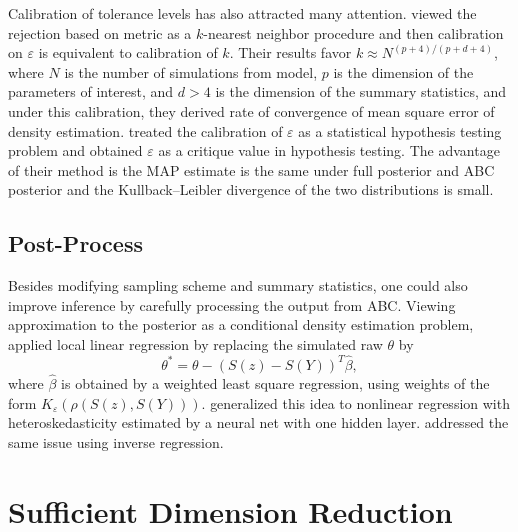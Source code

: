 Calibration of tolerance levels has also attracted many attention. \citet{biau2012new}
viewed the rejection based on metric as a $k$-nearest neighbor procedure
and then calibration on $\varepsilon$ is equivalent to calibration
of $k$. Their results favor $k\approx N^{\left(p+4\right)/\left(p+d+4\right)}$,
where $N$ is the number of simulations from model, $p$ is the dimension
of the parameters of interest, and $d>4$ is the dimension of the
summary statistics, and under this calibration, they derived rate
of convergence of mean square error of density estimation. \citet{ratmann2013statistical}
treated the calibration of $\varepsilon$ as a statistical hypothesis
testing problem and obtained $\varepsilon$ as a critique value in
hypothesis testing. The advantage of their method is the MAP estimate
is the same under full posterior and ABC posterior and the Kullback--Leibler
divergence of the two distributions is small. 


\subsection{Post-Process}

Besides modifying sampling scheme and summary statistics, one could
also improve inference by carefully processing the output from
ABC. Viewing approximation to the posterior as a conditional density
estimation problem, \citet{beaumont2002approximate} applied local
linear regression by replacing the simulated raw $\theta$ by 
\[
\theta^{*}=\theta-\left(S\left(z\right)-S\left(Y\right)\right)^{T}\hat{\beta},
\]
where $\hat{\beta}$ is obtained by a weighted least square regression,
using weights of the form $K_{\varepsilon}\left(\rho\left(S\left(z\right),S\left(Y\right)\right)\right)$.
\citet{blum2010non} generalized this idea to nonlinear regression
with heteroskedasticity estimated by a neural net with one hidden
layer. \citet{leuenberger2010bayesian} addressed the same issue using
inverse regression.


\section{Sufficient Dimension Reduction}




